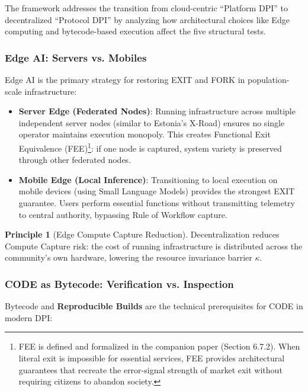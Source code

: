 \documentclass[11pt,a4paper]{article}
\theoremstyle{definition}
\newtheorem{principle}{Principle}[section]
\begin{document}
The framework addresses the transition from cloud-centric ``Platform DPI'' to decentralized ``Protocol DPI'' by analyzing how architectural choices like Edge computing and bytecode-based execution affect the five structural tests.

\subsubsection{Edge AI: Servers vs. Mobiles}

Edge AI is the primary strategy for restoring EXIT and FORK in population-scale infrastructure:

\begin{itemize}[noitemsep]
    \item \textbf{Server Edge (Federated Nodes)}: Running infrastructure across multiple independent server nodes (similar to Estonia's X-Road) ensures no single operator maintains execution monopoly. This creates Functional Exit Equivalence (FEE)\footnote{FEE is defined and formalized in the companion paper (Section 6.7.2). When literal exit is impossible for essential services, FEE provides architectural guarantees that recreate the error-signal strength of market exit without requiring citizens to abandon society.}: if one node is captured, system variety is preserved through other federated nodes.

    \item \textbf{Mobile Edge (Local Inference)}: Transitioning to local execution on mobile devices (using Small Language Models) provides the strongest EXIT guarantee. Users perform essential functions without transmitting telemetry to central authority, bypassing Rule of Workflow capture.
\end{itemize}

\begin{principle}[Edge Compute Capture Reduction]
Decentralization reduces Compute Capture risk: the cost of running infrastructure is distributed across the community's own hardware, lowering the resource invariance barrier $\kappa$.
\end{principle}

\subsubsection{CODE as Bytecode: Verification vs. Inspection}

Bytecode and \textbf{Reproducible Builds} are the technical prerequisites for CODE in modern DPI:
\end{document}
